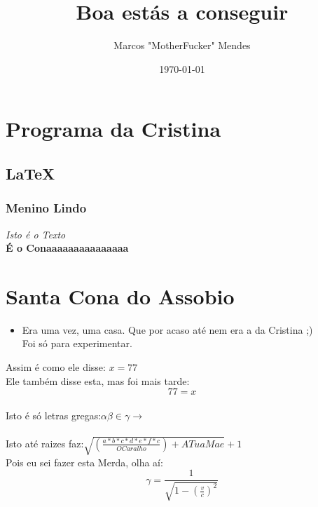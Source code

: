 \documentclass{report}
\title{Boa estás a conseguir}
\author{Marcos "MotherFucker" Mendes}
\date{\today}
\begin{document}
\maketitle
\tableofcontents

\chapter{Programa da Cristina}
\section{\LaTeX}
\subsection{Menino Lindo}

{\large \textit{Isto é o Texto}}\\
{\tiny \textbf{É o Conaaaaaaaaaaaaaaa}}\\
\chapter{Santa Cona do Assobio}
\begin{itemize}
\item {Era uma vez, uma casa. Que por acaso até nem era a da Cristina ;)}\\
Foi só para experimentar.\\
\end{itemize}
Assim é como ele disse: $x = 77$\\
Ele também disse esta, mas foi mais tarde:$$77 = x$$\\

Isto é só letras gregas:$\alpha\beta\in\gamma\rightarrow$\\\\
Isto até raizes faz:$\sqrt{\left(\frac{a*b*c*d*e*f*c}{OCaralho}\right)+ ATuaMae}+1$\\

Pois eu sei fazer esta Merda, olha aí:$$\gamma = \frac{1}{\sqrt{1-\left(\frac{v}{c}\right)^{2}}}$$
\end{document}
